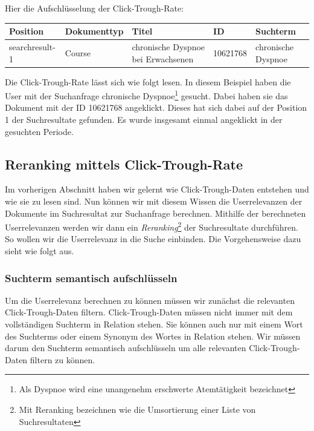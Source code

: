Hier die Aufschlüsselung der Click-Trough-Rate:

\begin{tabular}{|p{}|p{}|p{}|p{}|p{}|}\hline
	\textbf{Position} & \textbf{Dokumenttyp} & \textbf{Titel} & \textbf{ID} & \textbf{Suchterm} \\ \hline
	searchresult-1 & Course & chronische Dyspnoe bei Erwachsenen & 10621768 & chronische Dyspnoe \\ \hline
 \end{tabular}
 
Die Click-Trough-Rate lässt sich wie folgt lesen. In diesem Beispiel haben die User mit der Suchanfrage \glqq chronische Dyspnoe\footnote{Als Dyspnoe wird eine unangenehm erschwerte Atemtätigkeit bezeichnet}\grqq{} gesucht. Dabei haben sie das Dokument mit der ID 10621768 angeklickt. Dieses hat sich dabei auf der Position 1 der Suchresultate gefunden. Es wurde insgesamt einmal angeklickt in der gesuchten Periode. 

\subsection{Reranking mittels Click-Trough-Rate}
\label{sec:Einfuehrung:Methodik:Reranking}

Im vorherigen Abschnitt haben wir gelernt wie Click-Trough-Daten entstehen und wie sie zu lesen sind. Nun können wir mit diesem Wissen die Userrelevanzen der Dokumente im Suchresultat zur Suchanfrage berechnen. Mithilfe der berechneten Userrelevanzen werden wir dann ein \textit{Reranking}\footnote{Mit Reranking bezeichnen wie die Umsortierung einer Liste von Suchresultaten} der Suchresultate durchführen. So wollen wir die Userrelevanz in die Suche einbinden. Die Vorgehensweise dazu sieht wie folgt aus.

\subsubsection{Suchterm semantisch aufschlüsseln}
\label{sec:Einfuehrung:Methodik:Reranking:SuchtermSegmentierung}

Um die Userrelevanz berechnen zu können müssen wir zunächst die relevanten Click-Trough-Daten filtern. Click-Trough-Daten müssen nicht immer mit dem vollständigen Suchterm in Relation stehen. Sie können auch nur mit einem Wort des Suchterms oder einem Synonym des Wortes in Relation stehen. Wir müssen darum den Suchterm semantisch aufschlüsseln um alle relevanten Click-Trough-Daten filtern zu können. 

